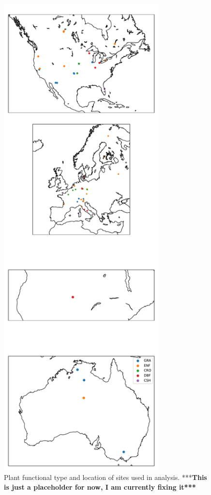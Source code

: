 \documentclass[draft,linenumbers]{gcbjournal}
\begin{document}
\begin{figure}[!p]
\centering
\includegraphics[width=20pc]{./fig01.pdf}
\caption{Plant functional type and location of sites used in analysis. ***\textbf{This is just  a placeholder for now, I am currently fixing it***}}
\label{map_fig}
 \end{figure}
\end{document}
